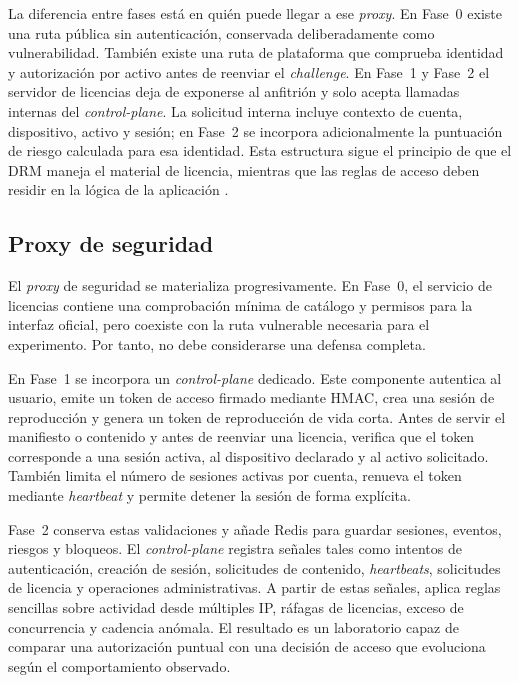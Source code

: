 La diferencia entre fases está en quién puede llegar a ese \textit{proxy}. En Fase~0 existe una ruta pública sin autenticación, conservada deliberadamente como vulnerabilidad. También existe una ruta de plataforma que comprueba identidad y autorización por activo antes de reenviar el \textit{challenge}. En Fase~1 y Fase~2 el servidor de licencias deja de exponerse al anfitrión y solo acepta llamadas internas del \textit{control-plane}. La solicitud interna incluye contexto de cuenta, dispositivo, activo y sesión; en Fase~2 se incorpora adicionalmente la puntuación de riesgo calculada para esa identidad. Esta estructura sigue el principio de que el DRM maneja el material de licencia, mientras que las reglas de acceso deben residir en la lógica de la aplicación \cite{w3ceme2026,widevine2024}.

\subsection{Proxy de seguridad}

El \textit{proxy} de seguridad se materializa progresivamente. En Fase~0, el servicio de licencias contiene una comprobación mínima de catálogo y permisos para la interfaz oficial, pero coexiste con la ruta vulnerable necesaria para el experimento. Por tanto, no debe considerarse una defensa completa.

En Fase~1 se incorpora un \textit{control-plane} dedicado. Este componente autentica al usuario, emite un token de acceso firmado mediante HMAC, crea una sesión de reproducción y genera un token de reproducción de vida corta. Antes de servir el manifiesto o contenido y antes de reenviar una licencia, verifica que el token corresponde a una sesión activa, al dispositivo declarado y al activo solicitado. También limita el número de sesiones activas por cuenta, renueva el token mediante \textit{heartbeat} y permite detener la sesión de forma explícita.

Fase~2 conserva estas validaciones y añade Redis para guardar sesiones, eventos, riesgos y bloqueos. El \textit{control-plane} registra señales tales como intentos de autenticación, creación de sesión, solicitudes de contenido, \textit{heartbeats}, solicitudes de licencia y operaciones administrativas. A partir de estas señales, aplica reglas sencillas sobre actividad desde múltiples IP, ráfagas de licencias, exceso de concurrencia y cadencia anómala. El resultado es un laboratorio capaz de comparar una autorización puntual con una decisión de acceso que evoluciona según el comportamiento observado.

